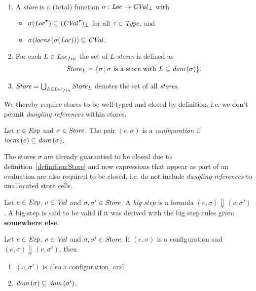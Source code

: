 \documentclass[12pt,a4paper]{report}
\newcommand{\CVal}{\nstyle{CVal}}
\begin{document}
\begin{definition}[Store] \label{definition:Store} \
  \begin{enumerate}
    \item A {\em store} is a (total) function $\sigma:\Loc \to \CVal_\bot$ with
          \begin{itemize}
            \item $\sigma(\Loc^\tau) \subseteq (\CVal^\tau)_\bot$ for all $\tau \in \mathit{Type}$, and
            \item $\sigma(\locns{\sigma(\Loc)}) \subseteq \CVal$.
          \end{itemize}

    \item For each $L\in\mathit{Loc}_{fin}$ the set of {\em $L$-stores} is defined as
          \[\begin{array}{l}
            \mathit{Store}_L = \{\sigma\,|\,\text{$\sigma$ is a store with $L\subseteq\mathit{dom}\,(\sigma)$}\}.
          \end{array}\]

    \item $\mathit{Store} = \bigcup_{L\in\mathit{Loc}_{fin}} \mathit{Store}_L$ denotes the set of all {\em stores}.
  \end{enumerate}
\end{definition}

We thereby require stores to be well-typed and closed by definition, i.e. we don't permit {\em dangling
references} within stores.

\begin{definition}[Configuration]
  Let $e\in\mathit{Exp}$ and $\sigma\in\mathit{Store}$. The pair $(e,\sigma)$ is a {\em configuration}
  if $\mathit{locns}\,(e) \subseteq \mathit{dom}\,(\sigma)$.
\end{definition}

The stores $\sigma$ are already guarantied to be closed due to definition~\ref{definition:Store} and
now expressions that appear as part of an evaluation are also required to be closed, i.e. do not
include {\em dangling references} to unallocated store cells.

\begin{definition}
  Let $e\in\mathit{Exp}$, $v\in\mathit{Val}$ and $\sigma,\sigma'\in\mathit{Store}$. A {\em big step} is a formula
  $(e,\sigma) \Downarrow (v,\sigma')$. A big step is said to be valid if it was derived with the
  big step rules given {\bf somewhere else}.
\end{definition}

\begin{corollary}
  Let $e\in\mathit{Exp}$, $v\in\mathit{Val}$ and $\sigma,\sigma'\in\mathit{Store}$. If $(e,\sigma)$ is a configuration
  and $(e,\sigma) \Downarrow (v,\sigma')$, then
  \begin{enumerate}
    \item $(v,\sigma')$ is also a configuration, and
    \item $\mathit{dom}\,(\sigma) \subseteq \mathit{dom}\,(\sigma')$.
  \end{enumerate}
\end{corollary}
\end{document}
